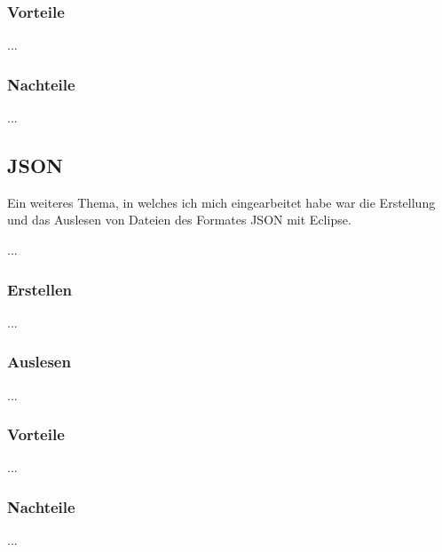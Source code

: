 \documentclass[12pt,a4paper,bibliography=totocnumbered,listof=totocnumbered]{scrartcl}
\begin{document}
\subsubsection{Vorteile}
...
\subsubsection{Nachteile}
...

\subsection{JSON}
Ein weiteres Thema, in welches ich mich eingearbeitet habe war die Erstellung und das Auslesen von Dateien
des Formates JSON mit Eclipse.

...

\subsubsection{Erstellen}
...
\subsubsection{Auslesen}
...
\subsubsection{Vorteile}
...
\subsubsection{Nachteile}
...
\end{document}
